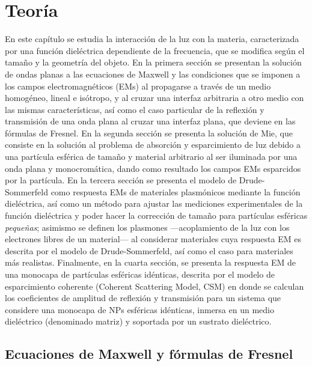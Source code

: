 \chapter{Teoría}

 En este capítulo se estudia la interacción de la luz con la materia, caracterizada por una función dieléctrica dependiente de la frecuencia, que se modifica según el tamaño y la geometría del objeto. En la primera sección se presentan la  solución de ondas planas a las ecuaciones de Maxwell y las condiciones que se imponen a los campos electromagnéticos (EMs) al propagarse a través de un medio homogéneo, lineal e isótropo, y al cruzar una interfaz arbitraria a otro medio con las mismas características, así como el caso particular de la reflexión y transmisión de una onda plana al cruzar una interfaz plana, que deviene en las fórmulas de Fresnel. En la segunda sección se presenta la solución de Mie, que consiste en la solución al problema de absorción y esparcimiento de luz debido a una partícula esférica de tamaño y material arbitrario al ser iluminada por una onda plana y monocromática, dando como resultado los campos EMs esparcidos por la partícula. En la tercera sección se presenta el modelo de Drude-Sommerfeld como respuesta EMs de materiales plasmónicos mediante la función dieléctrica, así como un método para ajustar las mediciones experimentales de la función dieléctrica y poder hacer la corrección de tamaño para partículas esféricas \emph{pequeñas}; asimismo se definen los plasmones ---acoplamiento de la luz con los electrones libres de un material--- al considerar materiales cuya respuesta EM es descrita por el modelo de Drude-Sommerfeld, así como el caso para materiales más realistas. Finalmente, en la cuarta sección, se presenta la respuesta EM de una monocapa de partículas esféricas idénticas, descrita por el modelo de esparcimiento coherente (Coherent Scattering Model, CSM) en donde se calculan los coeficientes de amplitud de reflexión y transmisión para un sistema que considere una monocapa de NPs esféricas idénticas, inmersa en un medio dieléctrico (denominado matriz) y soportada por un sustrato dieléctrico.

\section{Ecuaciones de Maxwell y fórmulas de Fresnel}

